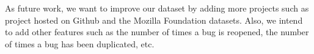 \documentclass{sig-alternate-05-2015}
\begin{document}
As future work, we want to improve our dataset by
adding more projects such as project hosted on Github and the Mozilla
Foundation datasets. Also, we intend to add other features
such as the number of times a bug is reopened, the number
of times a bug has been duplicated, etc.

%
%

%
%



%
\end{document}
